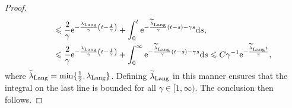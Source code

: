 \documentclass[11pt,a4paper]{article}
\newcommand{\e}{\mathrm{e}}
\renewcommand{\d}{\mathrm d}
\theoremstyle{plain}
\numberwithin{equation}{section}
\renewcommand{\leq}{\leqslant}
\renewcommand{\geq}{\geqslant}
\begin{document}
\begin{proof}
\begin{align}
         \notag
        &\qquad \leq
        \frac{2}{\gamma}\e^{-\frac{\lambda_{\rm Lang}}{\gamma} \left(t-\frac{1}{\gamma}\right)}
         + \int_{0}^{t} \e^{-\frac{\widetilde \lambda_{\rm Lang}}{\gamma}(t-s) - \gamma s} \d s, \\
        &\qquad \leq
        \frac{2}{\gamma}\e^{-\frac{\lambda_{\rm Lang}}{\gamma} \left(t-\frac{1}{\gamma}\right)}
         + \int_{0}^{\infty} \e^{-\frac{\widetilde \lambda_{\rm Lang}}{\gamma}(t-s) - \gamma s} \d s
        \leq C  \gamma^{-1} \e^{-\frac{\widetilde \lambda_{\rm Lang} t}{\gamma}},
    \end{align}
    where $\widetilde \lambda_{\rm Lang} = \min \{\frac{1}{2}, \lambda_{\rm Lang} \}$.
    Defining $\widetilde \lambda_{\rm Lang}$ in this manner ensures that the integral on the last line is bounded for all $\gamma \in [1, \infty)$.
    The conclusion then follows.
\end{proof}
\end{document}
